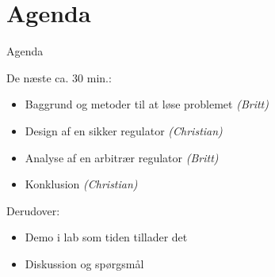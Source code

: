 \section{Agenda}
\begin{frame}{Agenda}{}
\begin{block}{De næste ca. 30 min.:}
  \begin{itemize}
    \item Baggrund og metoder til at løse problemet \textit{(Britt)}
    \item Design af en sikker regulator \textit{(Christian)}
    \item Analyse af en arbitrær regulator \textit{(Britt)}
    \item Konklusion \textit{(Christian)}
  \end{itemize}
\end{block}
\begin{block}{Derudover:}
  \begin{itemize}
    \item Demo i lab som tiden tillader det
    \item Diskussion og spørgsmål
  \end{itemize}
\end{block}
\vspace{1cm}
\end{frame}